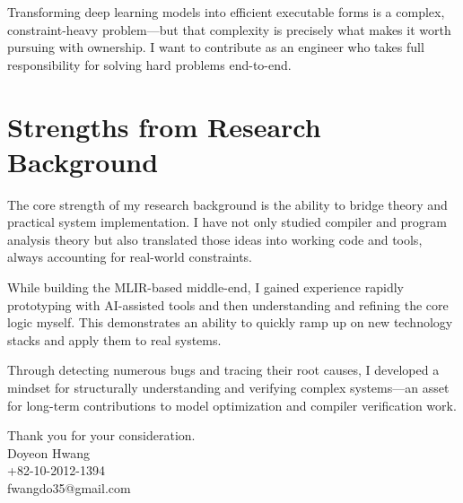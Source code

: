 \documentclass[a4paper,12pt]{article}
\begin{document}
Transforming deep learning models into efficient executable forms
is a complex, constraint-heavy problem---but
that complexity is precisely what makes it worth pursuing with ownership.
I want to contribute as an engineer
who takes full responsibility for solving hard problems end-to-end.

\section{Strengths from Research Background}

The core strength of my research background is
the ability to bridge theory and practical system implementation.
I have not only studied compiler and program analysis theory
but also translated those ideas into working code and tools,
always accounting for real-world constraints.

While building the MLIR-based middle-end,
I gained experience rapidly prototyping with AI-assisted tools
and then understanding and refining the core logic myself.
This demonstrates an ability to quickly ramp up on new technology stacks
and apply them to real systems.

Through detecting numerous bugs and tracing their root causes,
I developed a mindset for structurally understanding
and verifying complex systems---an asset
for long-term contributions to model optimization
and compiler verification work.

\vspace{1cm}

\begin{flushright}
Thank you for your consideration.\\[0.5cm]
Doyeon Hwang\\
+82-10-2012-1394\\
fwangdo35@gmail.com
\end{flushright}
\end{document}

